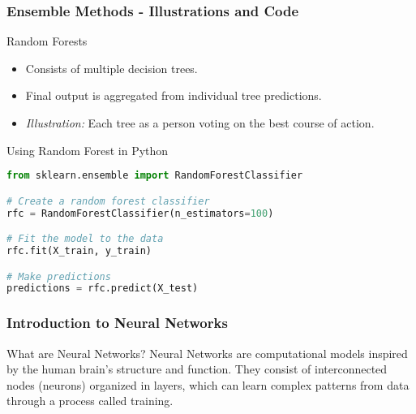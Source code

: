 \documentclass[aspectratio=169]{beamer}
\begin{document}
\begin{frame}[fragile]
    \frametitle{Ensemble Methods - Illustrations and Code}
    \begin{block}{Random Forests}
        \begin{itemize}
            \item Consists of multiple decision trees.
            \item Final output is aggregated from individual tree predictions.
            \item \textit{Illustration:} Each tree as a person voting on the best course of action.
        \end{itemize}
    \end{block}

    \begin{block}{Using Random Forest in Python}
        \begin{lstlisting}[language=Python]
from sklearn.ensemble import RandomForestClassifier

# Create a random forest classifier
rfc = RandomForestClassifier(n_estimators=100)

# Fit the model to the data
rfc.fit(X_train, y_train)

# Make predictions
predictions = rfc.predict(X_test)
        \end{lstlisting}
    \end{block}
\end{frame}

\begin{frame}[fragile]
    \frametitle{Introduction to Neural Networks}
    \begin{block}{What are Neural Networks?}
        Neural Networks are computational models inspired by the human brain's structure and function. They consist of interconnected nodes (neurons) organized in layers, which can learn complex patterns from data through a process called training.
    \end{block}
\end{frame}
\end{document}

